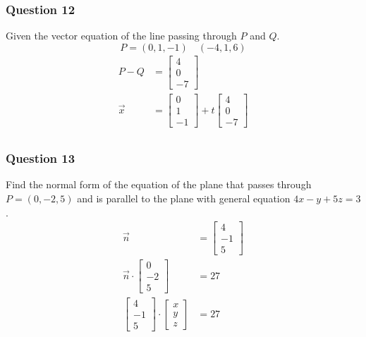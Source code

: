 \documentclass{math}
\begin{document}
\subsubsection*{Question 12}
Given the vector equation of the line passing through \( P \) and \( Q \).
\[ P = (0,1,-1) \quad (-4,1,6) \]
\begin{align*}
  P-Q &= \begin{bmatrix}4 \\ 0 \\ -7\end{bmatrix} \\
  \vec{x} &= \begin{bmatrix}0 \\ 1 \\ -1\end{bmatrix}+
    t\begin{bmatrix}4 \\ 0 \\ -7\end{bmatrix} \\
\end{align*}

\subsubsection*{Question 13}
Find the normal form of the equation of the plane that passes through
\( P = (0,-2,5) \) and is parallel to the plane with general equation
\( 4x-y+5z = 3 \).
\begin{align*}
  \vec{n} &= \begin{bmatrix}4 \\ -1 \\ 5\end{bmatrix} \\
  \vec{n}\cdot\begin{bmatrix}0 \\ -2 \\ 5\end{bmatrix} &= 27 \\
  \begin{bmatrix}4 \\ -1 \\ 5\end{bmatrix}\cdot
    \begin{bmatrix}x \\ y \\ z\end{bmatrix} &= 27
\end{align*}
\end{document}
